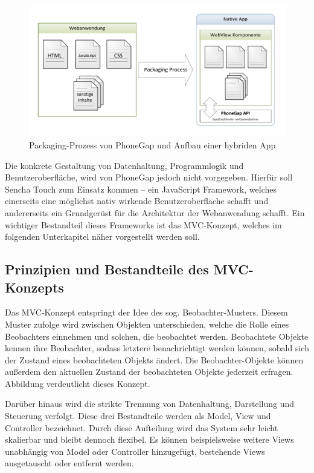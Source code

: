 \begin{figure}[H]
	\centering
	\includegraphics[width=.9\linewidth]{res/phonegap.pdf}
	\caption{Packaging-Prozess von PhoneGap und Aufbau einer hybriden App\protect\footnotemark}\label{abb:phonegap}
\end{figure}
\protect{}

Die konkrete Gestaltung von Datenhaltung, Programmlogik und Benutzeroberfläche, wird von PhoneGap jedoch nicht vorgegeben. Hierfür soll Sencha Touch zum Einsatz kommen -- ein JavaScript Framework, welches einerseits eine möglichst nativ wirkende Benutzeroberfläche schafft und andererseits ein Grundgerüst für die Architektur der Webanwendung schafft. Ein wichtiger Bestandteil dieses Frameworks ist das MVC-Konzept, welches im folgenden Unterkapitel näher vorgestellt werden soll.

\subsection{Prinzipien und Bestandteile des MVC-Konzepts}
Das MVC-Konzept entspringt der Idee des sog. Beobachter-Musters. Diesem Muster zufolge wird zwischen Objekten unterschieden, welche die Rolle eines Beobachters einnehmen und solchen, die beobachtet werden. %
Beobachtete Objekte kennen ihre Beobachter, sodass letztere benachrichtigt werden können, sobald sich der Zustand eines beobachteten Objekts ändert. Die Beobachter-Objekte können außerdem den aktuellen Zustand der beobachteten Objekte jederzeit erfragen. Abbildung %
verdeutlicht dieses Konzept.

Darüber hinaus wird die strikte Trennung von Datenhaltung, Darstellung und Steuerung verfolgt. Diese drei Bestandteile werden als Model, View und Controller bezeichnet. Durch diese Aufteilung wird das System sehr leicht skalierbar und bleibt dennoch flexibel. Es können beispielsweise weitere Views unabhängig von Model oder Controller hinzugefügt, bestehende Views ausgetauscht oder entfernt werden.

